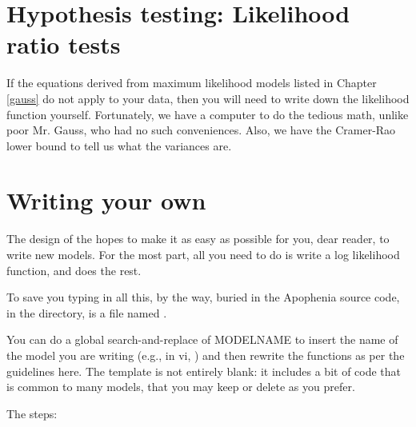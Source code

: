 \section{Hypothesis testing: Likelihood ratio tests} 
If the equations derived from maximum likelihood models listed in
Chapter \ref{gauss} do not apply to your data,
then you will need to write down the likelihood
function yourself.  Fortunately, we have a computer to do the tedious
math, unlike poor Mr. Gauss, who had no such conveniences.  Also, we
have the Cramer-Rao lower bound to tell us what the variances are.



\section{Writing your own}
The design of the  hopes to make it as easy as
possible for you, dear reader, to write new models. For the most
part, all you need to do is write a log likelihood function, and
 does the rest.  

To save you typing in all this, by the way, buried in the Apophenia
source code, in the  directory, is a file named
. 

You can do a global search-and-replace of MODELNAME to insert the name
of the model you are writing (e.g., in vi, )
and then rewrite the functions as per the guidelines here. The template
is not entirely blank: it includes a bit of code that is common to many
models, that you may keep or delete as you prefer.

The steps:

